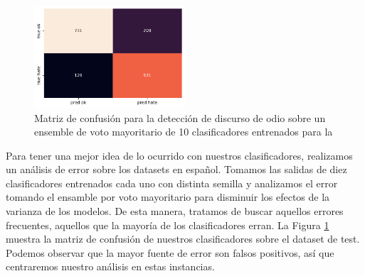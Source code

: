 
\begin{figure}[t]
    \centering
    \includegraphics[width=0.5\textwidth]{img/hateval_confusion_matrix.pdf}
    \caption{Matriz de confusión para la detección de discurso de odio sobre un ensemble de voto mayoritario de 10 clasificadores entrenados para la \subtaskb{}}
    \label{fig:hateval_error_analysis}
\end{figure}


Para tener una mejor idea de lo ocurrido con nuestros clasificadores, realizamos un análisis de error sobre los datasets en español. Tomamos las salidas de diez clasificadores \beto{} entrenados cada uno con distinta semilla y analizamos el error tomando el ensamble por voto mayoritario para disminuir los efectos de la varianza de los modelos. De esta manera, tratamos de buscar aquellos errores frecuentes, aquellos que la mayoría de los clasificadores erran. La Figura \ref{fig:hateval_error_analysis} muestra la matriz de confusión de nuestros clasificadores sobre el dataset de test. Podemos observar que la mayor fuente de error son falsos positivos, así que centraremos nuestro análisis en estas instancias.

